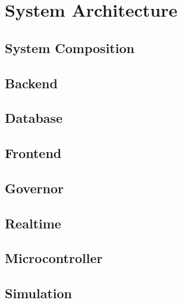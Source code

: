 \documentclass[../thesis.tex]{subfiles}
\begin{document}
\chapter{System Architecture}

\section{System Composition}

\section{Backend}

\section{Database}

\section{Frontend}

\section{Governor}

\section{Realtime}

\section{Microcontroller}

\section{Simulation}
\end{document}
